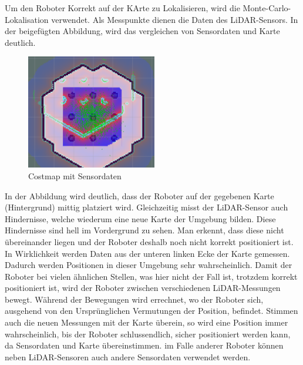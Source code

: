 {{	Um den Roboter Korrekt auf der KArte zu Lokalisieren, wird die Monte-Carlo-Lokalisation verwendet. Als Messpunkte dienen die Daten des LiDAR-Sensors. In der beigefügten Abbildung, wird das vergleichen von Sensordaten und Karte deutlich.
		\begin{figure}[H]
			\centering
			\includegraphics[height=5cm]{Bilder/costmap_monte_carlo_example.png}
			\caption{Costmap mit Sensordaten} 
			\label{pic:coastmontecarlo}
		\end{figure}
		In der Abbildung wird deutlich, dass der Roboter auf der gegebenen Karte (Hintergrund) mittig platziert wird. Gleichzeitig misst der LiDAR-Sensor auch Hindernisse, welche wiederum eine neue Karte der Umgebung bilden. Diese Hindernisse sind hell im Vordergrund zu sehen. Man erkennt, dass diese nicht übereinander liegen und der Roboter deshalb noch nicht korrekt positioniert ist. In Wirklichkeit werden Daten aus der unteren linken Ecke der Karte gemessen. Dadurch werden Positionen in dieser Umgebung sehr wahrscheinlich. Damit der Roboter bei vielen ähnlichen Stellen, was hier nicht der Fall ist, trotzdem korrekt positioniert ist, wird der Roboter zwischen verschiedenen LiDAR-Messungen bewegt. Während der Bewegungen wird errechnet, wo der Roboter sich, ausgehend von den Ursprünglichen Vermutungen der Position, befindet. Stimmen auch die neuen Messungen mit der Karte überein, so wird eine Position immer wahrscheinlich, bis der Roboter schlussendlich, sicher positioniert werden kann, da Sensordaten und Karte übereinstimmen. im Falle anderer Roboter können neben LiDAR-Sensoren auch andere Sensordaten verwendet werden.
	}
}